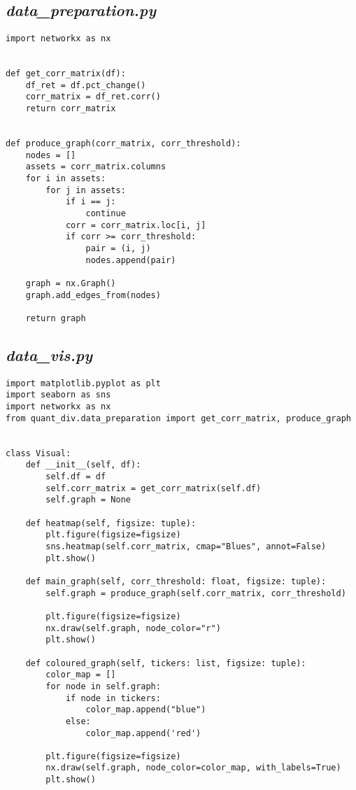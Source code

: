 \documentclass[12pt,a4paper,twoside,openany]{book}
\begin{document}
\subsection*{\textit{data\_preparation.py}}
\begin{verbatim}
import networkx as nx


def get_corr_matrix(df):
    df_ret = df.pct_change()
    corr_matrix = df_ret.corr()
    return corr_matrix


def produce_graph(corr_matrix, corr_threshold):
    nodes = []
    assets = corr_matrix.columns
    for i in assets:
        for j in assets:
            if i == j:
                continue
            corr = corr_matrix.loc[i, j]
            if corr >= corr_threshold:
                pair = (i, j)
                nodes.append(pair)

    graph = nx.Graph()
    graph.add_edges_from(nodes)

    return graph
\end{verbatim}

\subsection*{\textit{data\_vis.py}}
\begin{verbatim}
import matplotlib.pyplot as plt
import seaborn as sns
import networkx as nx
from quant_div.data_preparation import get_corr_matrix, produce_graph


class Visual:
    def __init__(self, df):
        self.df = df
        self.corr_matrix = get_corr_matrix(self.df)
        self.graph = None

    def heatmap(self, figsize: tuple):
        plt.figure(figsize=figsize)
        sns.heatmap(self.corr_matrix, cmap="Blues", annot=False)
        plt.show()

    def main_graph(self, corr_threshold: float, figsize: tuple):
        self.graph = produce_graph(self.corr_matrix, corr_threshold)

        plt.figure(figsize=figsize)
        nx.draw(self.graph, node_color="r")
        plt.show()

    def coloured_graph(self, tickers: list, figsize: tuple):
        color_map = []
        for node in self.graph:
            if node in tickers:
                color_map.append("blue")
            else:
                color_map.append('red')

        plt.figure(figsize=figsize)
        nx.draw(self.graph, node_color=color_map, with_labels=True)
        plt.show()


\end{verbatim}
\end{document}
